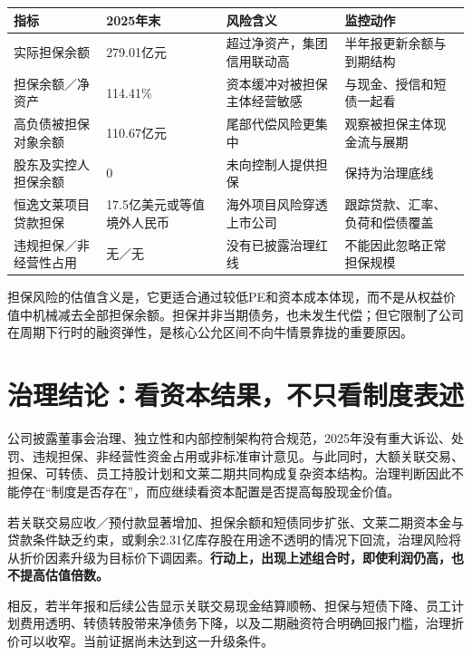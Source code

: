 \begin{exhibitbox}[担保与治理风险仪表盘]
\noindent\begin{tabularx}{\textwidth}{L{4.1cm}R{2.2cm}L{2.3cm}X}
\toprule
\textbf{指标} & \textbf{2025年末} & \textbf{风险含义} & \textbf{监控动作} \\
\midrule
实际担保余额 & 279.01亿元 & 超过净资产，集团信用联动高 & 半年报更新余额与到期结构 \\
担保余额／净资产 & 114.41\% & 资本缓冲对被担保主体经营敏感 & 与现金、授信和短债一起看 \\
高负债被担保对象余额 & 110.67亿元 & 尾部代偿风险更集中 & 观察被担保主体现金流与展期 \\
股东及实控人担保余额 & 0 & 未向控制人提供担保 & 保持为治理底线 \\
恒逸文莱项目贷款担保 & 17.5亿美元或等值境外人民币 & 海外项目风险穿透上市公司 & 跟踪贷款、汇率、负荷和偿债覆盖 \\
违规担保／非经营性占用 & 无／无 & 没有已披露治理红线 & 不能因此忽略正常担保规模 \\
\bottomrule
\end{tabularx}
\end{exhibitbox}

担保风险的估值含义是，它更适合通过较低PE和资本成本体现，而不是从权益价值中机械减去全部担保余额。担保并非当期债务，也未发生代偿；但它限制了公司在周期下行时的融资弹性，是核心公允区间不向牛情景靠拢的重要原因。

\section{治理结论：看资本结果，不只看制度表述}

公司披露董事会治理、独立性和内部控制架构符合规范，2025年没有重大诉讼、处罚、违规担保、非经营性资金占用或非标准审计意见。与此同时，大额关联交易、担保、可转债、员工持股计划和文莱二期共同构成复杂资本结构。治理判断因此不能停在“制度是否存在”，而应继续看资本配置是否提高每股现金价值。

\begin{riskbox}[治理失效条件]
若关联交易应收／预付款显著增加、担保余额和短债同步扩张、文莱二期资本金与贷款条件缺乏约束，或剩余2.31亿库存股在用途不透明的情况下回流，治理风险将从折价因素升级为目标价下调因素。\textbf{行动上，出现上述组合时，即使利润仍高，也不提高估值倍数。}
\end{riskbox}

相反，若半年报和后续公告显示关联交易现金结算顺畅、担保与短债下降、员工计划费用透明、转债转股带来净债务下降，以及二期融资符合明确回报门槛，治理折价可以收窄。当前证据尚未达到这一升级条件。
